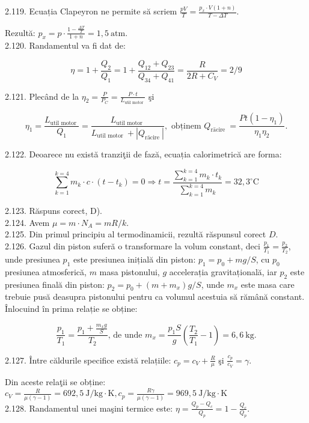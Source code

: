 2.119. Ecuația Clapeyron ne permite să scriem $\frac{p V}{T}=\frac{p_{x} \cdot V(1+n)}{T-\Delta T}$.

Rezultă: $p_{x}=p \cdot \frac{1-\frac{\Delta T}{T}}{1+n}=1,5 \mathrm{~atm}$.\\

2.120. Randamentul va fi dat de:

$$
\eta=1+\frac{Q_{2}}{Q_{1}}=1+\frac{Q_{12}+Q_{23}}{Q_{34}+Q_{41}}=\frac{R}{2 R+C_{V}}=2 / 9
$$

2.121. Plecând de la $\eta_{2}=\frac{P}{P_{C}}=\frac{P \cdot t}{L_{\text {util motor }}}$ şi

$$
\eta_{1}=\frac{L_{\text {util motor }}}{Q_{1}}=\frac{L_{\text {util motor }}}{L_{\text {util motor }}+\left|Q_{\text {răcire }}\right|}, \text { obținem } Q_{\text {rācire }}=\frac{P t\left(1-\eta_{1}\right)}{\eta_{1} \eta_{2}} .
$$

2.122. Deoarece nu există tranziţii de fază, ecuația calorimetrică are forma:

$$
\sum_{k=1}^{k=4} m_{k} \cdot c \cdot\left(t-t_{k}\right)=0 \Rightarrow t=\frac{\sum_{k=1}^{k=4} m_{k} \cdot t_{k}}{\sum_{k=1}^{k=4} m_{k}}=32,3^{\circ} \mathrm{C}
$$

2.123. Răspuns corect, D).\\
2.124. Avem $\mu=m \cdot N_{A}=m R / k$.\\
2.125. Din primul principiu al termodinamicii, rezultă răspunsul corect $D$.\\
2.126. Gazul din piston suferă o transformare la volum constant, deci $\frac{p_{1}}{T_{1}}=\frac{p_{2}}{T_{2}}$, unde presiunea $p_{1}$ este presiunea inițială din piston: $p_{1}=p_{0}+m g / S$, cu $p_{0}$ presiunea atmosferică, $m$ masa pistonului, $g$ accelerația gravitațională, iar $p_{2}$ este presiunea finală din piston: $p_{2}=p_{0}+\left(m+m_{x}\right) g / S$, unde $m_{x}$ este masa care trebuie pusă deasupra pistonului pentru ca volumul acestuia să rămână constant. Înlocuind în prima relație se obține:

$$
\frac{p_{1}}{T_{1}}=\frac{p_{1}+\frac{m_{x} g}{S}}{T_{2}} \text {, de unde } m_{x}=\frac{p_{1} S}{g}\left(\frac{T_{2}}{T_{1}}-1\right)=6,6 \mathrm{~kg} .
$$

2.127. Între căldurile specifice există relațiile: $c_{p}=c_{V}+\frac{R}{\mu}$ şi $\frac{c_{p}}{c_{V}}=\gamma$.

Din aceste relaţii se obține:\\
$c_{V}=\frac{R}{\mu(\gamma-1)}=692,5 \mathrm{~J} / \mathrm{kg} \cdot \mathrm{K}, c_{p}=\frac{R \gamma}{\mu(\gamma-1)}=969,5 \mathrm{~J} / \mathrm{kg} \cdot \mathrm{K}$\\
2.128. Randamentul unei maşini termice este: $\eta=\frac{Q_{p}-Q_{c}}{Q_{p}}=1-\frac{Q_{c}}{Q_{p}}$.

